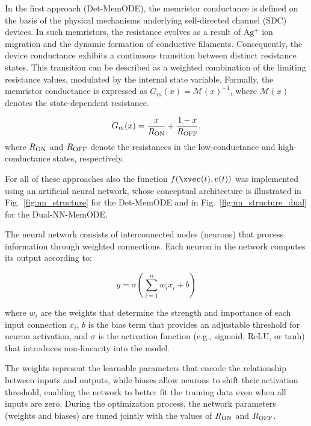 \documentclass[11pt, oneside]{article}
\newcommand{\M}{\mathcal{M}}
\newcommand{\Ron}{R_{\rm ON}}
\newcommand{\Roff}{R_{\rm OFF}}
\newcommand{\ua}{v}
\begin{document}
In the first approach (Det-MemODE), the memristor conductance is defined on the basis of the physical mechanisms underlying self-directed channel (SDC) devices. In such memristors, the resistance evolves as a result of \(\mathrm{Ag^+}\) ion migration and the dynamic formation of conductive filaments. Consequently, the device conductance exhibits a continuous transition between distinct resistance states. This transition can be described as a weighted combination of the limiting resistance values, modulated by the internal state variable. Formally, the memristor conductance is expressed as \(G_m(x) = \M(x)^{-1}\), where \(\M(x)\) denotes the state-dependent resistance.

\begin{equation}
    G_{m}(x) = \frac{x}{R_{\rm ON}} + \frac{1 - x}{R_{\rm OFF}},
    \label{eq:conductance}
\end{equation}
where \(\Ron\) and \(\Roff\) denote the resistances in the low-conductance and high-conductance states, respectively.


For all of these approaches also the function \(f(\xvec(t), \ua(t))\) was implemented using an artificial neural network, whose conceptual architecture is illustrated in Fig.~\ref{fig:nn_structure} for the Det-MemODE and in Fig.~\ref{fig:nn_structure_dual} for the Dual-NN-MemODE.

The neural network consists of interconnected nodes (neurons) that process information through weighted connections. Each neuron in the network computes its output according to:

\begin{equation}
    y = \sigma\left(\sum_{i=1}^{n} w_i x_i + b\right)
\end{equation}

where \(w_i\) are the weights that determine the strength and importance of each input connection \(x_i\), \(b\) is the bias term that provides an adjustable threshold for neuron activation, and \(\sigma\) is the activation function (e.g., sigmoid, ReLU, or tanh) that introduces non-linearity into the model.

The weights represent the learnable parameters that encode the relationship between inputs and outputs, while biases allow neurons to shift their activation threshold, enabling the network to better fit the training data even when all inputs are zero. During the optimization process, the network parameters (weights and biases) are tuned jointly with the values of \(R_{\rm ON}\) and \(R_{\rm OFF}\).
\end{document}

